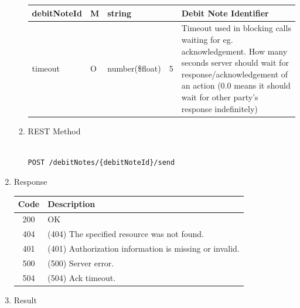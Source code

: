 \begin{enumerate}
\begin{enumerate}
\begin{table}[H]
\begin{center}
\begin{tabular}{|p{3cm}|l|p{3cm}|p{3cm}|p{4cm}|}
debitNoteId				& M	&	string				&								&	Debit Note Identifier \\
\hline   

timeout					& O &	number(\$float)		&	5							&	Timeout used in blocking calls waiting for eg. acknowledgement. 
																						How many seconds server should wait for response/acknowledgement 
																						of an action 
																						(0.0 means it should wait for other party's response indefinitely) \\
\hline

\end{tabular}
\end{center}
\end{table}


\item REST Method

\begin{tcolorbox}[boxrule=0pt, frame empty]
\begin{verbatim} 

POST /debitNotes/{debitNoteId}/send

\end{verbatim}
\end{tcolorbox}

\end{enumerate}

\item Response

\begin{table}[H]
\footnotesize

\begin{center}
\begin{tabular}{|c|l|} 
\hline
\rowcolor{lightgray}	Code 		& 	Description \\
\hline
200	 		&	OK \\
\hline
404			&	(404) The specified resource was not found. \\
\hline
401			&	(401) Authorization information is missing or invalid. \\
\hline
500			&	(500) Server error. \\
\hline
504			&	(504) Ack timeout. \\
\hline

\end{tabular}
\end{center}

\end{table}

\item Result


\end{enumerate}
